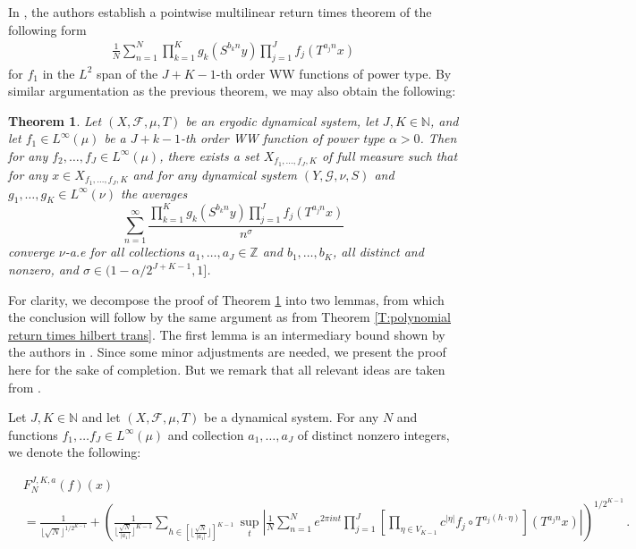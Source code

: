 \documentclass[11pt, oneside]{amsart}   	%
\newcommand{\1}{\mathbbm{1}}
\newcommand{\N}{\mathbb{N}}
\newcommand{\floor}[1]{\lfloor#1\rfloor}
\newtheorem{theorem}{Theorem}[section]
\theoremstyle{definition}
\begin{document}
In \cite{assani2024higherorderwienerwintnersystems}, the authors establish a pointwise multilinear return times theorem of the following form
\begin{align*}
\frac{1}{N} \sum_{n=1}^N \prod_{k=1}^K g_{k} (S^{b_k n} y) \prod_{j=1}^J f_{j} (T^{a_j n} x)
\end{align*}
for $f_1$ in the $L^2$ span of the $J+K-1$-th order WW functions of power type. By similar argumentation as the previous theorem, we may also obtain the following:

\begin{theorem}\label{T:mult hilb trans}
Let $(X, \mathcal{F}, \mu, T)$ be an ergodic dynamical system, let $J, K\in \N$, and let $f_1\in L^\infty(\mu)$ be a $J + k - 1$-th order WW function of power type $\alpha > 0$. Then for any $f_2, \dots, f_{J} \in L^\infty(\mu)$, there exists a set $X_{f_1, \dots, f_{J}, K}$ of full measure such that for any $x\in X_{f_1, \dots, f_J, K}$ and for any dynamical system $(Y, \mathcal{G},\nu, S)$ and $g_1, \dots, g_K\in L^\infty(\nu)$ the averages
$$\sum_{n=1}^\infty \frac{\prod_{k=1}^K g_{k} (S^{b_k n} y) \prod_{j=1}^J f_{j} (T^{a_j n} x)}{n^\sigma}$$
converge $\nu$-a.e for all collections $a_1, \dots, a_J\in \mathbb{Z}$ and $b_1, \dots, b_K$, all distinct and nonzero, and $\sigma\in (1 - \alpha/2^{J+K-1}, 1]$.
\end{theorem}

For clarity, we decompose the proof of Theorem \ref{T:mult hilb trans} into two lemmas, from which the conclusion will follow by the same argument as from Theorem \ref{T:polynomial return times hilbert trans}. The first lemma is an intermediary bound shown by the authors in \cite{assani2024higherorderwienerwintnersystems}.
Since some minor adjustments are needed, we present the proof here for the sake of completion. But we remark that all relevant ideas are taken from \cite{assani2024higherorderwienerwintnersystems}.

Let $J, K\in \N$ and let $(X, \mathcal{F},\mu,  T)$ be a dynamical system. For any $N$ and functions $f_1, \dots f_J\in L^\infty(\mu)$ and collection $a_1, \dots, a_J$ of distinct nonzero integers, we denote the following:

\begin{align*}
&F^{J, K, a}_N(f)(x) \\
&=  \frac{1}{\floor{\sqrt{N}}^{1/2^{K-1}}}+ \left(\frac{1}{\floor{\frac{\sqrt{N}}{|a_1|}}^{K-1}} \sum_{h \in \left[\floor{\frac{\sqrt{N}}{|a_1|}}\right]^{K-1}} \sup_{t} \left| \frac{1}{N} \sum_{n=1}^N e^{2\pi i n t} \prod_{j=1}^J \left[\prod_{\eta\in V_{K-1}} c^{|\eta|} f_j \circ T^{a_j (h \cdot \eta)}\right](T^{a_j n} x)\right| \right)^{1/2^{K-1}} \, .
\end{align*}
\end{document}
